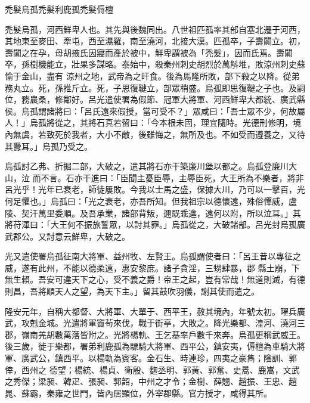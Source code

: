 
\begin{pinyinscope}

 禿髮烏孤禿髮利鹿孤禿髮傉檀



 禿髮烏孤，河西鮮卑人也。其先與後魏同出。八世祖匹孤率其部自塞北遷于河西，其地東至麥田、牽屯，西至濕羅，南至澆河，北接大漠。匹孤卒，子壽闐立。初，壽闐之在孕，母胡掖氏因寢而產於被中，鮮卑謂被為「禿髮」，因而氏焉。壽闐卒，孫樹機能立，壯果多謀略。泰始中，殺秦州刺史胡烈於萬斛堆，敗涼州刺史蘇愉于金山，盡有
 涼州之地，武帝為之旰食。後為馬隆所敗，部下殺之以降。從弟務丸立。死，孫推斤立。死，子思復鞬立，部眾稍盛。烏孤即思復鞬之子也。及嗣位，務農桑，修鄰好。呂光遣使署為假節、冠軍大將軍、河西鮮卑大都統、廣武縣侯。烏孤謂諸將曰：「呂氏遠來假授，當可受不？」眾咸曰：「吾士眾不少，何故屬人！」烏孤將從之，其將石真若留曰：「今本根未固，理宜隨時。光德刑修明，境內無虞，若致死於我者，大小不敵，後雖悔之，無所及也。不如受而遵養之，又待其釁耳。」烏孤乃受之。



 烏孤討乙弗、折掘二部，大破之，遣其將石亦干築廉川堡以都之。烏孤登廉川大山，泣
 而不言。石亦干進曰：「臣聞主憂臣辱，主辱臣死，大王所為不樂者，將非呂光乎！光年已衰老，師徒屢敗。今我以士馬之盛，保據大川，乃可以一擊百，光何足懼也。」烏孤曰：「光之衰老，亦吾所知。但我祖宗以德懷遠，殊俗憚威，盧陵、契汗萬里委順。及吾承業，諸部背叛，邇既乖違，遠何以附，所以泣耳。」其將苻渾曰：「大王何不振旅誓眾，以討其罪。」烏孤從之，大破諸部。呂光封烏孤廣武郡公。又討意云鮮卑，大破之。



 光又遣使署烏孤征南大將軍、益州牧、左賢王。烏孤謂使者曰：「呂王昔以專征之威，遂有此州，不能以德柔遠，惠安黎庶。諸子貪淫，三甥肆暴，郡
 縣土崩，下無生賴。吾安可違天下之心，受不義之爵！帝王之起，豈有常哉！無道則滅，有德則昌，吾將順天人之望，為天下主。」留其鼓吹羽儀，謝其使而遣之。



 隆安元年，自稱大都督、大將軍、大單于、西平王，赦其境內，年號太初。曜兵廣武，攻剋金城。光遣將軍竇茍來伐，戰于街亭，大敗之。降光樂都、湟河、澆河三郡，嶺南羌胡數萬落皆附之。光將楊軌、王乞基率戶數千來奔。烏孤更稱武威王。後三歲，徙于樂都，署弟利鹿孤為驃騎大將軍、西平公，鎮安夷，傉檀為車騎大將軍、廣武公，鎮西平。以楊軌為賓客。金石生、時連珍，四夷之豪雋；陰訓、郭倖，西州之
 德望；楊統、楊貞、衛殷、麴丞明、郭黃、郭奮、史暠、鹿嵩，文武之秀傑；梁昶、韓疋、張昶、郭韶，中州之才令；金樹、薛翹、趙振、王忠、趙晁、蘇霸，秦雍之世門，皆內居顯位，外宰郡縣。官方授才，咸得其所。




\end{pinyinscope}
